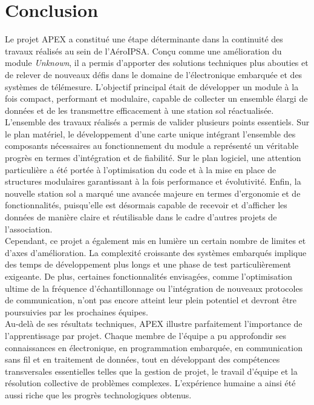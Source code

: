 \documentclass{article}
\newlength{\larg}
\begin{document}
\section*{Conclusion}

Le projet APEX a constitué une étape déterminante dans la continuité des travaux
réalisés au sein de l’AéroIPSA. Conçu comme une amélioration du module
\textit{Unknown}, il a permis d’apporter des solutions techniques plus abouties
et de relever de nouveaux défis dans le domaine de l’électronique embarquée
et des systèmes de télémesure. L’objectif principal était de développer un
module à la fois compact, performant et modulaire, capable de collecter un
ensemble élargi de données et de les transmettre efficacement à une station sol
réactualisée.\\

L’ensemble des travaux réalisés a permis de valider plusieurs points essentiels.
Sur le plan matériel, le développement d’une carte unique intégrant l’ensemble
des composants nécessaires au fonctionnement du module a représenté un véritable
progrès en termes d’intégration et de fiabilité. Sur le plan logiciel, une
attention particulière a été portée à l’optimisation du code et à la mise en
place de structures modulaires garantissant à la fois performance et évolutivité.
Enfin, la nouvelle station sol a marqué une avancée majeure en termes d’ergonomie
et de fonctionnalités, puisqu’elle est désormais capable de recevoir et
d’afficher les données de manière claire et réutilisable dans le cadre
d’autres projets de l’association.\\

Cependant, ce projet a également mis en lumière un certain nombre de limites et
d’axes d’amélioration. La complexité croissante des systèmes embarqués implique
des temps de développement plus longs et une phase de test particulièrement
exigeante. De plus, certaines fonctionnalités envisagées, comme l’optimisation
ultime de la fréquence d’échantillonnage ou l’intégration de nouveaux protocoles
de communication, n’ont pas encore atteint leur plein potentiel et devront être
poursuivies par les prochaines équipes.\\

Au-delà de ses résultats techniques, APEX illustre parfaitement l’importance de
l’apprentissage par projet. Chaque membre de l’équipe a pu approfondir ses
connaissances en électronique, en programmation embarquée, en communication
sans fil et en traitement de données, tout en développant des compétences
transversales essentielles telles que la gestion de projet, le travail
d’équipe et la résolution collective de problèmes complexes. L’expérience
humaine a ainsi été aussi riche que les progrès technologiques obtenus.\\
\end{document}

